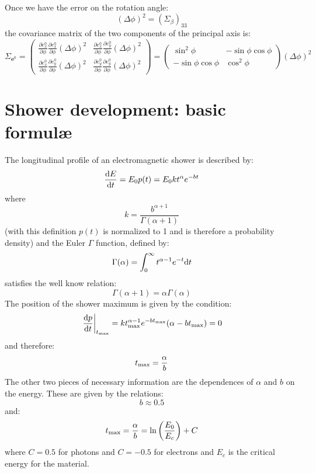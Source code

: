 \documentclass[a4paper,11pt]{article}
\newcommand{\pder}[2]{\frac{\partial#1}{\partial#2}}
\newcommand{\firstder}[2]{\frac{{\rm d}#1}{{\rm d}#2}}
\newcommand{\tmax}{t_{\rm max}}
\newcommand{\diff}{{\rm d}}
\begin{document}
Once we have the error on the rotation angle:
\begin{equation}
  (\Delta\phi)^2 = (\Sigma_\beta)_{33}
\end{equation}
the covariance matrix of the two components of the principal axis is:
\begin{equation}
  \Sigma_{\mathbf{e}^0} =
  \begin{pmatrix}
    \pder{e^0_x}{\phi}\pder{e^0_x}{\phi}(\Delta\phi)^2 &
    \pder{e^0_x}{\phi}\pder{e^0_y}{\phi}(\Delta\phi)^2\\
    \pder{e^0_x}{\phi}\pder{e^0_y}{\phi}(\Delta\phi)^2 &
    \pder{e^0_y}{\phi}\pder{e^0_y}{\phi}(\Delta\phi)^2
  \end{pmatrix} =
  \begin{pmatrix}
    \sin^2\phi & -\sin\phi\cos\phi\\
    -\sin\phi\cos\phi & \cos^2\phi
  \end{pmatrix}(\Delta\phi)^2
\end{equation}




\section{Shower development: basic formul\ae}

The longitudinal profile of an electromagnetic shower is described by:
\begin{equation}
\firstder{E}{t} = E_0 p(t) = E_0 k t^\alpha e^{-bt}
\end{equation}
where
$$
k = \frac{b^{\alpha + 1}}{\Gamma(\alpha + 1)}
$$
(with this definition $p(t)$ is normalized to 1 and is therefore a probability
density) and the Euler $\Gamma$ function, defined by:
$$
\Gamma(\alpha) = \int_{0}^\infty t^{\alpha - 1} e^{-t} \diff t
$$
satisfies the well know relation:
$$
\Gamma(\alpha + 1) = \alpha \Gamma(\alpha)
$$
The position of the shower maximum is given by the condition:
$$
\left.\firstder{p}{t}\right|_{\tmax} =
k \tmax^{\alpha - 1} e^{-b\tmax} (\alpha  - b\tmax) = 0
$$
and therefore:
\begin{equation}
\tmax = \frac{\alpha}{b}
\end{equation}
The other two pieces of necessary information are the dependences of $\alpha$
and $b$ on the energy. These are given by the relations:
\begin{equation}
b \approx 0.5
\end{equation}
and:
\begin{equation}
\tmax = \frac{\alpha}{b} = \ln\left(\frac{E_0}{E_c}\right) + C
\end{equation}
where $C=0.5$ for photons and $C=-0.5$ for electrons and $E_c$ is the critical
energy for the material.
\end{document}
